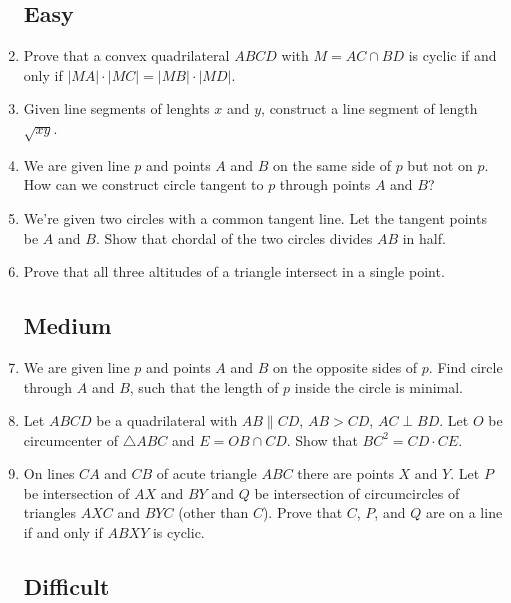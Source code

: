 \documentclass[11pt,a5paper]{article}
\begin{document}
\begin{enumerate}
\subsection*{Easy}
    \item{Prove that a convex quadrilateral $ABCD$ with $M = AC \cap BD$ is cyclic if and only if $|MA|\cdot|MC| = |MB|\cdot|MD|$.}
    
    \item{Given line segments of lenghts $x$ and $y$, construct a line segment of length $\sqrt{xy}$.}

	\item{We are given line $p$ and points $A$ and $B$ on the same side of $p$ but not on $p$. How can we construct circle tangent to $p$ through points $A$ and $B$?}
	
		\item{We're given two circles with a common tangent line. Let the tangent points be $A$ and $B$. Show that chordal of the two circles divides $AB$ in half.}
		
		\item{Prove that all three altitudes of a triangle intersect in a single point.}
	
\subsection*{Medium}

	\item{We are given line $p$ and points $A$ and $B$ on the opposite sides of $p$. Find circle through $A$ and $B$, such that the length of $p$ inside the circle is minimal.}

	\item{Let $ABCD$ be a quadrilateral with $AB \parallel CD$, $AB > CD$, $AC \perp BD$. Let $O$ be circumcenter of $\triangle ABC$ and $E = OB \cap CD$. Show that $BC^2 = CD \cdot CE$.}
	
	\item{On lines $CA$ and $CB$ of acute triangle $ABC$ there are points $X$ and $Y$. Let $P$ be intersection of $AX$ and $BY$ and $Q$ be intersection of circumcircles of triangles $AXC$ and $BYC$ (other than $C$). Prove that $C$, $P$, and $Q$ are on a line if and only if $ABXY$ is cyclic.}
	
	\subsection*{Difficult}
	

\end{enumerate}
\end{document}
